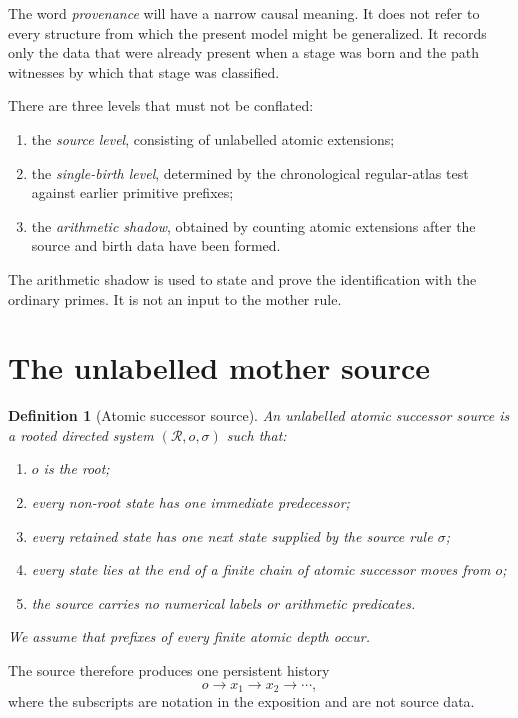 \documentclass[11pt]{article}
\newtheorem{definition}[theorem]{Definition}
\begin{document}
The word \emph{provenance} will have a narrow causal meaning.  It does not
refer to every structure from which the present model might be generalized.
It records only the data that were already present when a stage was born and
the path witnesses by which that stage was classified.

There are three levels that must not be conflated:
\begin{enumerate}[label=(\roman*)]
\item the \emph{source level}, consisting of unlabelled atomic extensions;
\item the \emph{single-birth level}, determined by the chronological
regular-atlas test against earlier primitive prefixes;
\item the \emph{arithmetic shadow}, obtained by counting atomic extensions
after the source and birth data have been formed.
\end{enumerate}
The arithmetic shadow is used to state and prove the identification with the
ordinary primes.  It is not an input to the mother rule.

\section{The unlabelled mother source}

\begin{definition}[Atomic successor source]
An \emph{unlabelled atomic successor source} is a rooted directed system
$(\mathscr R,o,\sigma)$ such that:
\begin{enumerate}[label=(\roman*)]
\item $o$ is the root;
\item every non-root state has one immediate predecessor;
\item every retained state has one next state supplied by the source rule
$\sigma$;
\item every state lies at the end of a finite chain of atomic successor moves
from $o$;
\item the source carries no numerical labels or arithmetic predicates.
\end{enumerate}
We assume that prefixes of every finite atomic depth occur.
\end{definition}

The source therefore produces one persistent history
\[
o\longrightarrow x_1\longrightarrow x_2\longrightarrow\cdots,
\]
where the subscripts are notation in the exposition and are not source data.
\end{document}
